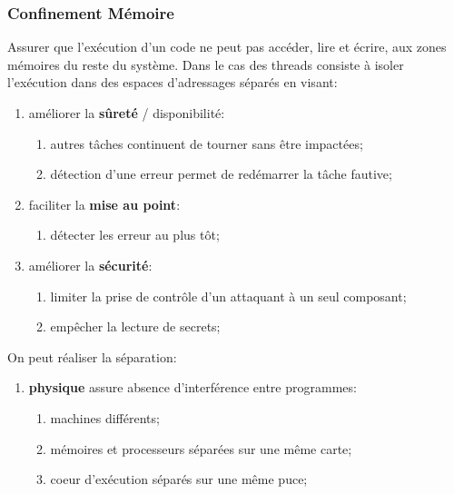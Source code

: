 \documentclass{article}
\begin{document}
\subsubsection{Confinement Mémoire}
\begin{definition}
    Assurer que l'exécution d'un code ne peut pas accéder, lire et écrire, aux zones mémoires du reste du système. Dans le cas des threads consiste à isoler l'exécution dans des espaces d'adressages séparés en visant:
    \begin{enumerate}
        \item améliorer la \textbf{sûreté} / disponibilité:
        \begin{enumerate}[noitemsep]
            \item autres tâches continuent de tourner sans être impactées;
            \item détection d'une erreur permet de redémarrer la tâche fautive;
        \end{enumerate}
        \item faciliter la \textbf{mise au point}:
        \begin{enumerate}[noitemsep]
            \item détecter les erreur au plus tôt;
        \end{enumerate}
        \item améliorer la \textbf{sécurité}:
        \begin{enumerate}[noitemsep]
            \item limiter la prise de contrôle d'un attaquant à un seul composant;
            \item empêcher la lecture de secrets;
        \end{enumerate}
    \end{enumerate}
    On peut réaliser la séparation:
    \begin{enumerate}[rightmargin = \leftmargin]
        \item \textbf{physique} assure absence d'interférence entre programmes:
        \begin{enumerate}[noitemsep]
            \item machines différents;
            \item mémoires et processeurs séparées sur une même carte;
            \item coeur d'exécution séparés sur une même puce;
        \end{enumerate}


\end{enumerate}
\end{definition}
\end{document}
